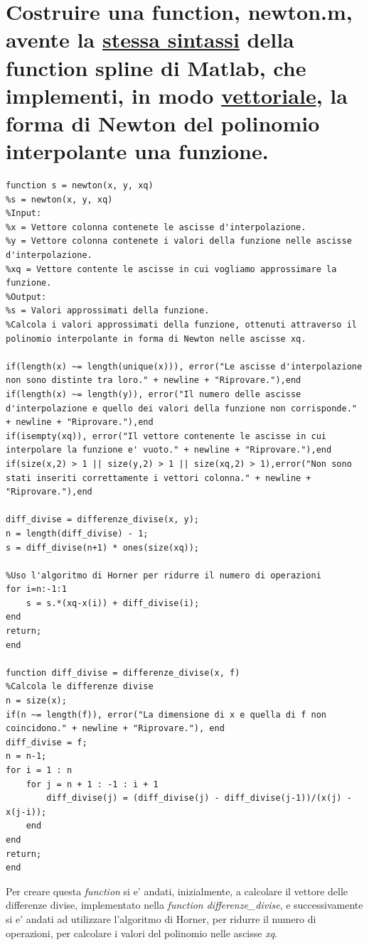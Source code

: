 \documentclass[10pt,a4paper]{article}
\begin{document}
\section{
  Costruire una function, \textbf{newton.m}, avente la \underline{stessa sintassi} della function \textbf{spline}
  di Matlab, che implementi, in modo \underline{vettoriale}, la forma di Newton del polinomio interpolante una
  funzione.
 }
 \begin{lstlisting}[style=Matlab-editor]
function s = newton(x, y, xq)
%s = newton(x, y, xq)
%Input:
%x = Vettore colonna contenete le ascisse d'interpolazione.
%y = Vettore colonna contenete i valori della funzione nelle ascisse d'interpolazione.
%xq = Vettore contente le ascisse in cui vogliamo approssimare la funzione.
%Output:
%s = Valori approssimati della funzione.
%Calcola i valori approssimati della funzione, ottenuti attraverso il polinomio interpolante in forma di Newton nelle ascisse xq.
  
if(length(x) ~= length(unique(x))), error("Le ascisse d'interpolazione non sono distinte tra loro." + newline + "Riprovare."),end 
if(length(x) ~= length(y)), error("Il numero delle ascisse d'interpolazione e quello dei valori della funzione non corrisponde." + newline + "Riprovare."),end
if(isempty(xq)), error("Il vettore contenente le ascisse in cui interpolare la funzione e' vuoto." + newline + "Riprovare."),end
if(size(x,2) > 1 || size(y,2) > 1 || size(xq,2) > 1),error("Non sono stati inseriti correttamente i vettori colonna." + newline + "Riprovare."),end
 
diff_divise = differenze_divise(x, y);
n = length(diff_divise) - 1;
s = diff_divise(n+1) * ones(size(xq));
  
%Uso l'algoritmo di Horner per ridurre il numero di operazioni
for i=n:-1:1
    s = s.*(xq-x(i)) + diff_divise(i);  
end
return;
end
  
function diff_divise = differenze_divise(x, f)
%Calcola le differenze divise
n = size(x);
if(n ~= length(f)), error("La dimensione di x e quella di f non coincidono." + newline + "Riprovare."), end
diff_divise = f;
n = n-1;
for i = 1 : n
    for j = n + 1 : -1 : i + 1
        diff_divise(j) = (diff_divise(j) - diff_divise(j-1))/(x(j) - x(j-i));
    end
end
return;
end
\end{lstlisting}

Per creare questa \textit{function} si e' andati, inizialmente, a calcolare il
vettore delle differenze divise, implementato nella \textit{function differenze\_divise}, e
successivamente si e' andati ad utilizzare l'algoritmo di Horner, per ridurre
il numero di operazioni, per calcolare i valori del polinomio nelle ascisse \textit{xq}.
\end{document}
